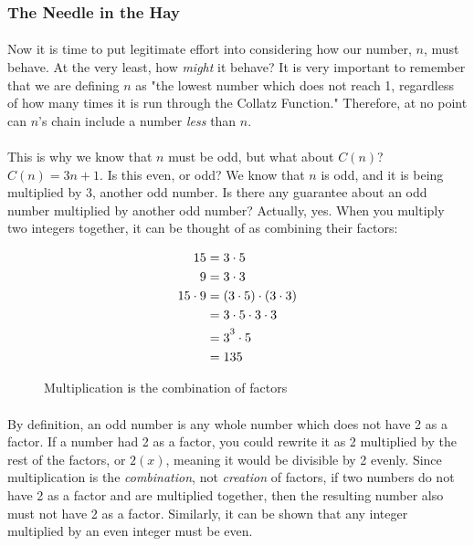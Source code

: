 \documentclass[12pt,letterpaper]{article}
\begin{document}
		\subsubsection{The Needle in the Hay} \label{sss:needle}
				
			\paragraph{} Now it is time to put legitimate effort into considering how our number, $n$, must behave. At the very least, how \textit{might} it behave? It is very important to remember that we are defining $n$ as "the lowest number which does not reach 1, regardless of how many times it is run through the Collatz Function." Therefore, at no point can $n$'s chain include a number \textit{less} than $n$.
			
			\paragraph{} This is why we know that $n$ must be odd, but what about $C(n)$? $C(n) = 3n + 1$. Is this even, or odd? We know that $n$ is odd, and it is being multiplied by $3$, another odd number. Is there any guarantee about an odd number multiplied by another odd number? Actually, yes. When you multiply two integers together, it can be thought of as combining their factors:
			
			\begin{figure}[h]
				\begin{align*}
					15 &= 3 \cdot 5\\
					9 &= 3 \cdot 3\\
					15 \cdot 9 &= (3 \cdot 5) \cdot (3 \cdot 3)\\
					&= 3 \cdot 5 \cdot 3 \cdot 3 \\
					&= 3\strut^3 \cdot 5\\
					&= 135
				\end{align*}
				
				\caption{Multiplication is the combination of factors}
				\label{fig:multiplication}
			\end{figure}
		
			\paragraph{} By definition, an odd number is any whole number which does not have 2 as a factor. If a number had 2 as a factor, you could rewrite it as 2 multiplied by the rest of the factors, or $2(x)$, meaning it would be divisible by 2 evenly. Since multiplication is the \textit{combination}, not \textit{creation} of factors, if two numbers do not have 2 as a factor and are multiplied together, then the resulting number also must not have 2 as a factor. Similarly, it can be shown that any integer multiplied by an even integer must be even.
			
\end{document}
